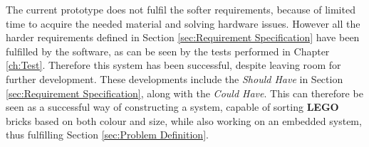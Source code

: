 The current prototype does not fulfil the softer requirements, because of limited time to acquire the needed material and solving hardware issues.
However all the harder requirements defined in Section \ref{sec:Requirement Specification} have been fulfilled by the software, as can be seen by the tests performed in Chapter \ref{ch:Test}.
Therefore this system has been successful, despite leaving room for further development.
These developments include the \textit{Should Have} in Section \ref{sec:Requirement Specification}, along with the \textit{Could Have}.
This can therefore be seen as a successful way of constructing a system, capable of sorting \textbf{LEGO} bricks based on both colour and size, while also working on an embedded system, thus fulfilling Section \ref{sec:Problem Definition}.


        
        
    


